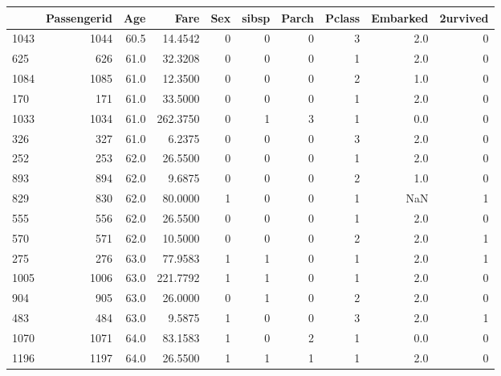 \begin{tabular}{lrrrrrrrrr}
\toprule
{} &  Passengerid &   Age &      Fare &  Sex &  sibsp &  Parch &  Pclass &  Embarked &  2urvived \\
\midrule
1043 &         1044 &  60.5 &   14.4542 &    0 &      0 &      0 &       3 &       2.0 &         0 \\
625  &          626 &  61.0 &   32.3208 &    0 &      0 &      0 &       1 &       2.0 &         0 \\
1084 &         1085 &  61.0 &   12.3500 &    0 &      0 &      0 &       2 &       1.0 &         0 \\
170  &          171 &  61.0 &   33.5000 &    0 &      0 &      0 &       1 &       2.0 &         0 \\
1033 &         1034 &  61.0 &  262.3750 &    0 &      1 &      3 &       1 &       0.0 &         0 \\
326  &          327 &  61.0 &    6.2375 &    0 &      0 &      0 &       3 &       2.0 &         0 \\
252  &          253 &  62.0 &   26.5500 &    0 &      0 &      0 &       1 &       2.0 &         0 \\
893  &          894 &  62.0 &    9.6875 &    0 &      0 &      0 &       2 &       1.0 &         0 \\
829  &          830 &  62.0 &   80.0000 &    1 &      0 &      0 &       1 &       NaN &         1 \\
555  &          556 &  62.0 &   26.5500 &    0 &      0 &      0 &       1 &       2.0 &         0 \\
570  &          571 &  62.0 &   10.5000 &    0 &      0 &      0 &       2 &       2.0 &         1 \\
275  &          276 &  63.0 &   77.9583 &    1 &      1 &      0 &       1 &       2.0 &         1 \\
1005 &         1006 &  63.0 &  221.7792 &    1 &      1 &      0 &       1 &       2.0 &         0 \\
904  &          905 &  63.0 &   26.0000 &    0 &      1 &      0 &       2 &       2.0 &         0 \\
483  &          484 &  63.0 &    9.5875 &    1 &      0 &      0 &       3 &       2.0 &         1 \\
1070 &         1071 &  64.0 &   83.1583 &    1 &      0 &      2 &       1 &       0.0 &         0 \\
1196 &         1197 &  64.0 &   26.5500 &    1 &      1 &      1 &       1 &       2.0 &         0 \\

\end{tabular}

